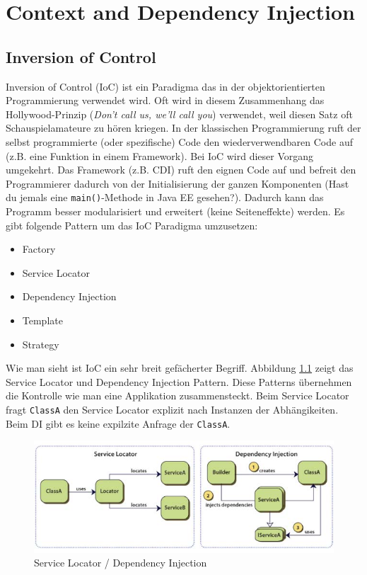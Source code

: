 \chapter{Context and Dependency Injection}
 
\section{Inversion of Control}

Inversion of Control (IoC) ist ein Paradigma das in der objektorientierten Programmierung verwendet wird.  Oft wird in diesem Zusammenhang das Hollywood-Prinzip (\emph{Don't call us, we'll call you}) verwendet, weil diesen Satz oft Schauspielamateure zu hören kriegen. In der klassischen Programmierung ruft der selbst programmierte (oder spezifische) Code den wiederverwendbaren Code auf (z.B. eine Funktion in einem Framework). Bei IoC wird dieser Vorgang umgekehrt. Das Framework (z.B. CDI) ruft den eignen Code auf und befreit den Programmierer dadurch von der Initialisierung der ganzen Komponenten (Hast du jemals eine \verb|main()|-Methode in Java EE gesehen?). Dadurch kann das Programm besser modularisiert und erweitert (keine Seiteneffekte) werden. Es gibt folgende Pattern um das IoC Paradigma umzusetzen:
\begin{itemize}
	\item Factory
	\item Service Locator
	\item Dependency Injection
	\item Template
	\item Strategy
\end{itemize}
Wie man sieht ist IoC ein sehr breit gefächerter Begriff. Abbildung \ref{fig:service-locator-di} zeigt das Service Locator und Dependency Injection Pattern. Diese Patterns übernehmen die Kontrolle wie man eine Applikation zusammensteckt. Beim Service Locator fragt \verb|ClassA| den Service Locator explizit nach Instanzen der Abhängikeiten. Beim DI gibt es keine expilzite Anfrage der \verb|ClassA|.

\begin{figure}
\centering
\includegraphics[width=0.7\linewidth]{fig/service-locator-di}
\caption{Service Locator / Dependency Injection}
\label{fig:service-locator-di}
\end{figure}

